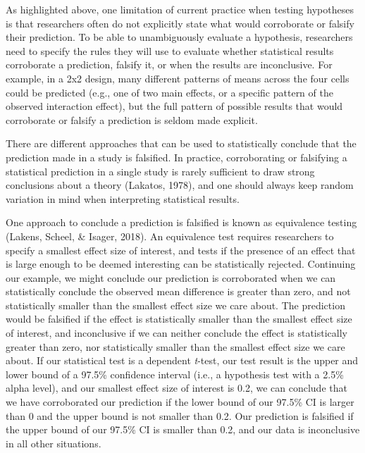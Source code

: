 \documentclass[english,doc,floatsintext]{apa6}
\begin{document}
As highlighted above, one limitation of current practice when testing hypotheses is that researchers often do not explicitly state what would corroborate or falsify their prediction. To be able to unambiguously evaluate a hypothesis, researchers need to specify the rules they will use to evaluate whether statistical results corroborate a prediction, falsify it, or when the results are inconclusive. For example, in a 2x2 design, many different patterns of means across the four cells could be predicted (e.g., one of two main effects, or a specific pattern of the observed interaction effect), but the full pattern of possible results that would corroborate or falsify a prediction is seldom made explicit.

There are different approaches that can be used to statistically conclude that the prediction made in a study is falsified. In practice, corroborating or falsifying a statistical prediction in a single study is rarely sufficient to draw strong conclusions about a theory (Lakatos, 1978), and one should always keep random variation in mind when interpreting statistical results.

One approach to conclude a prediction is falsified is known as equivalence testing (Lakens, Scheel, \& Isager, 2018). An equivalence test requires researchers to specify a smallest effect size of interest, and tests if the presence of an effect that is large enough to be deemed interesting can be statistically rejected. Continuing our example, we might conclude our prediction is corroborated when we can statistically conclude the observed mean difference is greater than zero, and not statistically smaller than the smallest effect size we care about. The prediction would be falsified if the effect is statistically smaller than the smallest effect size of interest, and inconclusive if we can neither conclude the effect is statistically greater than zero, nor statistically smaller than the smallest effect size we care about. If our statistical test is a dependent \emph{t}-test, our test result is the upper and lower bound of a 97.5\% confidence interval (i.e., a hypothesis test with a 2.5\% alpha level), and our smallest effect size of interest is 0.2, we can conclude that we have corroborated our prediction if the lower bound of our 97.5\% CI is larger than 0 and the upper bound is not smaller than 0.2. Our prediction is falsified if the upper bound of our 97.5\% CI is smaller than 0.2, and our data is inconclusive in all other situations.
\end{document}
